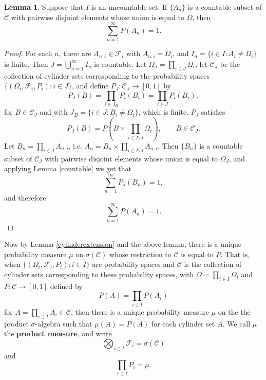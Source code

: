\documentclass{article}
\theoremstyle{definition}
\newtheorem{lemma}[theorem]{Lemma}
\theoremstyle{definition}
\begin{document}
\begin{lemma}
Suppose that $I$ is an uncountable set. 
If $\{A_n\}$ is a countable subset of $\mathscr{C}$ with pairwise disjoint elements whose union is equal to $\Omega$, then
\[
\sum_{n=1}^\infty P(A_n)=1.
\]
\end{lemma}
\begin{proof}
For each $n$,
there are $A_{n,i} \in \mathscr{F}_i$ with $A_{n,i} = \Omega_i$, and
$I_n = \{i \in I: A_i \neq \Omega_i\}$ is finite. 
Then $J=\bigcup_{n=1}^\infty I_n$ is countable. Let $\Omega_J=\prod_{i \in J} \Omega_i$, let
$\mathscr{C}_J$ be the collection of cylinder sets corresponding to the probability
spaces $\{(\Omega_i,\mathscr{F}_i,P_i): i \in J\}$, and define $P_J:\mathscr{C}_J \to [0,1]$ by 
\[
P_J(B) = \prod_{i \in J_B} P_i(B_i) = \prod_{i \in J} P_i(B_i),
\]
for $B \in \mathscr{C}_J$ and with $J_B=\{i \in J: B_i \neq \Omega_i\}$, which is finite. $P_J$ satisfies
\[
P_J(B) = P\left(B \times \prod_{i \in I \setminus J} \Omega_i \right), \qquad B \in \mathscr{C}_J. 
\]
Let $B_n=\prod_{i \in J} A_{n,i}$,
i.e. $A_n = B_n \times \prod_{i \in I \setminus J} A_{n,i}$. 
 Then $\{B_n\}$ is a countable subset of $\mathscr{C}_J$ with pairwise disjoint elements whose
union is equal to $\Omega_J$, and
applying Lemma \ref{countable} we get that 
\[
\sum_{n=1}^\infty P_J(B_n)=1,
\]
and therefore
\[
\sum_{n=1}^\infty P(A_n) = 1.
\]
\end{proof}

Now by Lemma \ref{cylinderextension} and the above lemma, there is a unique probability measure $\mu$ on
$\sigma(\mathscr{C})$ whose restriction to $\mathscr{C}$ is equal to $P$. That is, 
when $\{(\Omega_i,\mathscr{F}_i,P_i): i \in I\}$ are probability spaces and
$\mathscr{C}$ is the collection of cylinder sets corresponding to these probability spaces, with
$\Omega=\prod_{i \in I} \Omega_i$ and $P:\mathscr{C} \to [0,1]$ defined by
\[
P(A) = \prod_{i \in I} P(A_i)
\]
for $A = \prod_{i \in I} A_i \in \mathscr{C}$, 
then there is a unique probability
measure $\mu$ on the the product $\sigma$-algebra such that
$\mu(A) = P(A)$ for each cylinder set $A$. We call
$\mu$ the \textbf{product measure}, and write 
\[
\bigotimes_{i \in I} \mathscr{F}_i = \sigma(\mathscr{C})
\]
and
\[
\prod_{i \in I} P_i
=
\mu. 
\]
\end{document}
